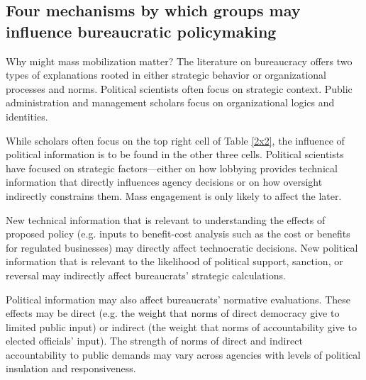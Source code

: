 \subsection{Four mechanisms by which groups may influence bureaucratic policymaking}


Why might mass mobilization matter? The literature on bureaucracy offers two types of explanations rooted in either strategic behavior or organizational processes and norms. Political scientists often focus on strategic context. Public administration and management scholars focus on organizational logics and identities. 

While scholars often focus on the top right cell of Table \ref{2x2}, the influence of political information is to be found in the other three cells. Political scientists have focused on strategic factors---either on how lobbying provides technical information that directly influences agency decisions or on how oversight indirectly constrains them.  Mass engagement is only likely to affect the later.

New technical information that is relevant to understanding the effects of proposed policy (e.g. inputs to benefit-cost analysis such as the cost or benefits for regulated businesses) may directly affect technocratic decisions. 
New political information that is relevant to the likelihood of political support, sanction, or reversal may indirectly affect bureaucrats' strategic calculations.

Political information may also affect bureaucrats' normative evaluations. These effects may be
direct (e.g. the weight that norms of direct democracy give to limited public input) or 
indirect (the weight that norms of accountability give to elected officials' input).
The strength of norms of direct and indirect accountability to public demands may vary across agencies with levels of political insulation and responsiveness.

